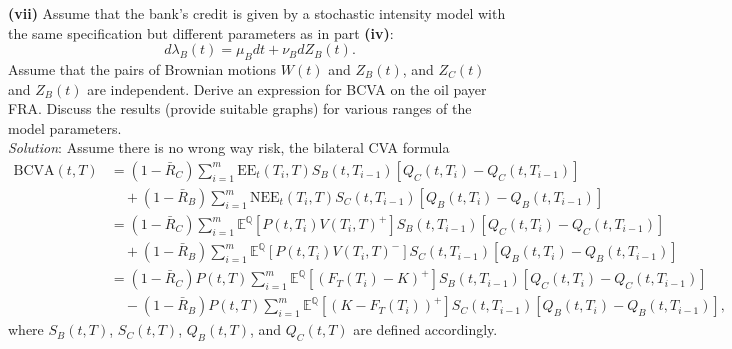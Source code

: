 \documentclass[paper=a4, fontsize=11pt]{scrartcl} %
\numberwithin{equation}{section} %
\numberwithin{figure}{section} %
\numberwithin{table}{section} %
\begin{document}
\textbf{(vii)} Assume that the bank's credit is given by a stochastic intensity model
with the same specification but different parameters as in part \textbf{(iv)}:
$$
d\lambda_B (t) = \mu_B dt + \nu_B dZ_B(t).
$$
Assume that the pairs of Brownian motions $W(t)$ and $Z_B(t)$, and $Z_C(t)$ and $Z_B(t)$ are independent.
Derive an expression for BCVA on the oil payer FRA. Discuss the results (provide suitable graphs) for various
ranges of the model parameters.\\
\textit{Solution}: Assume there is no wrong way risk, the bilateral CVA formula
\begin{align*}
\text{BCVA}(t,T) &= (1-\bar{R}_C)\sum_{i=1}^m \text{EE}_t(T_i,T) S_B(t,T_{i-1})\left[ Q_C(t,T_i) - Q_C(t,T_{i-1}) \right]\\
&\quad +(1-\bar{R}_B)\sum_{i=1}^m \text{NEE}_t(T_i,T)S_C(t,T_{i-1}) \left[ Q_B(t,T_i) - Q_B(t,T_{i-1}) \right] \\
&= (1-\bar{R}_C)\sum_{i=1}^m \mathbb{E}^{\mathbb{Q}}[P(t,T_i)V(T_i, T)^+] S_B(t,T_{i-1})\left[ Q_C(t,T_i) - Q_C(t,T_{i-1}) \right]\\
&\quad +(1-\bar{R}_B)\sum_{i=1}^m \mathbb{E}^{\mathbb{Q}}[P(t,T_i)V(T_i, T)^-] S_C(t,T_{i-1})\left[ Q_B(t,T_i) - Q_B(t,T_{i-1}) \right] \\
&= (1-\bar{R}_C)P(t,T)\sum_{i=1}^m \mathbb{E}^{\mathbb{Q}}[(F_T(T_i)-K)^+] S_B(t,T_{i-1})\left[ Q_C(t,T_i) - Q_C(t,T_{i-1}) \right]\\
&\quad -(1-\bar{R}_B)P(t,T)\sum_{i=1}^m \mathbb{E}^{\mathbb{Q}}[(K-F_T(T_i))^+] S_C(t,T_{i-1})\left[ Q_B(t,T_i) - Q_B(t,T_{i-1}) \right],
\end{align*}
where $S_B(t,T)$, $S_C(t,T)$, $Q_B(t,T)$, and $Q_C(t,T)$ are defined accordingly.
\end{document}

